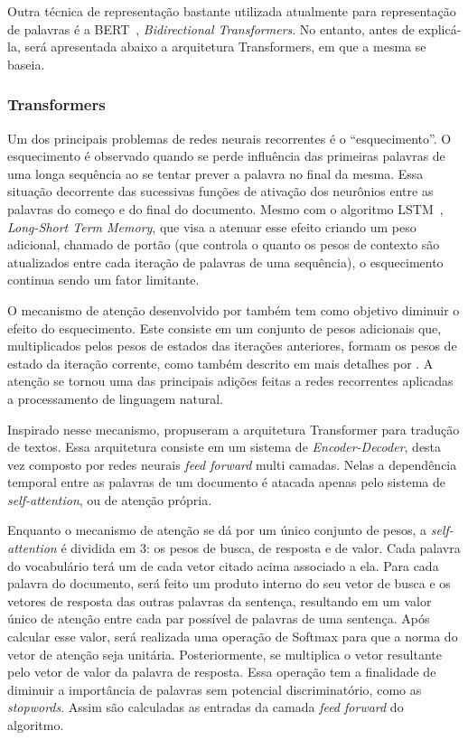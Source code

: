 Outra técnica de representação bastante utilizada atualmente para representação
de palavras é a BERT~\cite{devlin18}, \textit{Bidirectional Transformers}.
No entanto, antes de explicá-la, será apresentada abaixo a arquitetura
Transformers, em que a mesma se baseia.

\subsubsection{Transformers}

Um dos principais problemas de redes neurais recorrentes é o ``esquecimento''.
O esquecimento é observado quando se perde influência das primeiras palavras de
uma longa sequência ao se tentar prever a palavra no final da mesma.
Essa situação decorrente das sucessivas funções de ativação dos neurônios entre
as palavras do começo e do final do documento.
Mesmo com o algoritmo LSTM~\cite{hochreiter97}, \textit{Long-Short Term Memory},
que visa a atenuar esse efeito criando um peso adicional, chamado de portão (que
controla o quanto os pesos de contexto são atualizados entre cada iteração de
palavras de uma sequência), o esquecimento continua sendo um fator limitante.

O mecanismo de atenção desenvolvido por \citet{bahdanau14} também tem como
objetivo diminuir o efeito do esquecimento.
Este consiste em um conjunto de pesos adicionais que, multiplicados pelos pesos
de estados das iterações anteriores, formam os pesos de estado da iteração
corrente, como também descrito em mais detalhes por \citet{luong15}.
A atenção se tornou uma das principais adições feitas a redes recorrentes
aplicadas a processamento de linguagem natural.


Inspirado nesse mecanismo, \citet{vaswani17} propuseram a arquitetura
Transformer para tradução de textos.
Essa arquitetura consiste em um sistema de \textit{Encoder-Decoder}, desta vez
composto por redes neurais \textit{feed forward} multi camadas.
Nelas a dependência temporal entre as palavras de um documento é atacada apenas
pelo sistema de \textit{self-attention}, ou de atenção própria.

Enquanto o mecanismo de atenção se dá por um único conjunto de pesos, a
\textit{self-attention} é dividida em 3: os pesos de busca, de resposta e de
valor.
Cada palavra do vocabulário terá um de cada vetor citado acima associado a ela.
Para cada palavra do documento, será feito um produto interno do seu vetor de
busca e os vetores de resposta das outras palavras da sentença, resultando em um
valor único de atenção entre cada par possível de palavras de uma sentença.
Após calcular esse valor, será realizada uma operação de Softmax para que a norma
do vetor de atenção seja unitária.
Posteriormente, se multiplica o vetor resultante pelo vetor de valor da palavra
de resposta.
Essa operação tem a finalidade de diminuir a importância de palavras sem
potencial discriminatório, como as \textit{stopwords}.
Assim são calculadas as entradas da camada \textit{feed forward} do algoritmo.

